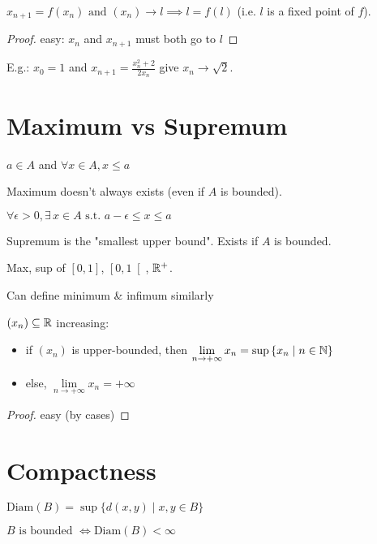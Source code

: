 \begin{theorem}
	$x_{n+1} = f(x_n) \text{ and } (x_n) \to l \implies l = f(l)$ (i.e. $l$ is a fixed point of $f$). 
\end{theorem}
\begin{proof}
	easy: $x_n$ and $x_{n+1}$ must both go to $l$
\end{proof}
E.g.: $x_0=1$ and $x_{n+1}=\frac{x_n^2+2}{2x_n}$ give $x_n \to \sqrt{2}$.


\section{Maximum vs Supremum}

\begin{definition}[$a$ maximum of $A$]
	$a \in A$ and $\forall x \in A, x \leq a$
\end{definition}
Maximum doesn't always exists (even if $A$ is bounded).
\begin{definition}[$a$ supremum of $A$]
	$\forall \epsilon>0, \exists \, x \in A \text{ s.t. } a-\epsilon \leq x \leq a$
\end{definition}
Supremum is the "smallest upper bound". Exists if $A$ is bounded.

\begin{question}
	Max, sup of $\left[ 0,1 \right]$, $\left[ 0,1 \right[$, $\mathbb{R}^+$.
\end{question}

\begin{remark}
	Can define minimum \& infimum similarly
\end{remark}

\begin{theorem}
	$(x_n) \subseteq \mathbb{R}$ increasing:
	\begin{itemize}
		\item if $(x_n)$ is upper-bounded, then $\lim\limits_{n \to +\infty} x_n = \sup \left\{ x_n \mid n \in \mathbb{N} \right\}$
		\item else, $\lim\limits_{n \to +\infty} x_n = +\infty$
	\end{itemize}
\end{theorem}
\begin{proof}
	easy (by cases)
\end{proof}



\section{Compactness}
\begin{definition}[Diameter]
	$\text{Diam}(B)=\sup\{ d(x,y) \mid x,y \in B \}$
\end{definition}
\begin{definition}[Boundedness]
	$B \text{ is bounded } \iff \text{Diam}(B)<\infty$ 
\end{definition}


